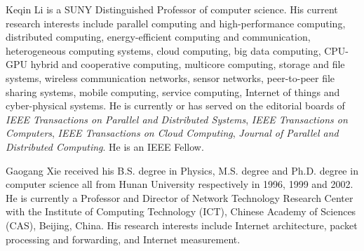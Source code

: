 \documentclass[10pt,journal,compsoc]{IEEEtran}
\begin{document}
\begin{IEEEbiography}{Keqin Li} is a SUNY Distinguished Professor of computer science. His current research interests include parallel computing and high-performance computing, distributed computing, energy-efficient computing and communication, heterogeneous computing systems,
cloud computing, big data computing, CPU-GPU hybrid and cooperative computing, multicore computing,
storage and file systems, wireless communication networks, sensor networks, peer-to-peer file sharing systems,
mobile computing, service computing, Internet of things and cyber-physical systems. He is currently or has served on the editorial boards of {\em IEEE Transactions on Parallel and Distributed Systems}, {\em IEEE Transactions on Computers},
{\em IEEE Transactions on Cloud Computing}, {\em Journal of Parallel and Distributed Computing}.
He is an IEEE Fellow.
\end{IEEEbiography}
\vspace{-30pt}
\begin{IEEEbiography}{Gaogang Xie}
received his B.S. degree in Physics, M.S. degree and Ph.D. degree in computer science all from Hunan University respectively in 1996, 1999 and 2002. He is currently a Professor and Director of Network Technology Research Center with the Institute of Computing Technology (ICT), Chinese Academy of Sciences (CAS), Beijing, China. His research interests include Internet architecture, packet processing and forwarding, and Internet measurement.
\end{IEEEbiography}





\end{document}
